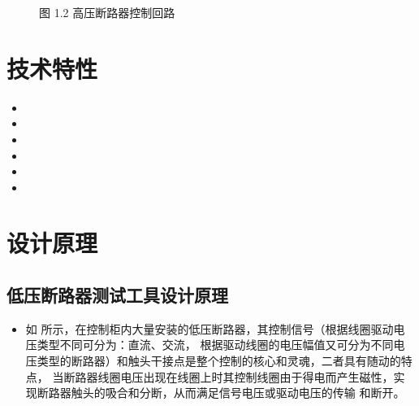 \documentclass[a4paper,10pt,english]{sphinxmanual}
\begin{document}
\begin{figure}[htbp]
\centering
\capstart

\noindent{}
\caption{图 1.2 高压断路器控制回路}\label{\detokenize{summary:id3}}\end{figure}


\section{技术特性}
\label{\detokenize{te_characteristics:id1}}\label{\detokenize{te_characteristics::doc}}\begin{itemize}
\item {} 
\sphinxAtStartPar
{}

\item {} 
\sphinxAtStartPar
{}

\item {} 
\sphinxAtStartPar
{}

\item {} 
\sphinxAtStartPar
{}

\item {} 
\sphinxAtStartPar
{}

\item {} 
\sphinxAtStartPar
{}

\end{itemize}


\section{设计原理}
\label{\detokenize{work_principle:id1}}\label{\detokenize{work_principle::doc}}

\subsection{低压断路器测试工具设计原理}
\label{\detokenize{work_principle:id2}}\begin{itemize}
\item {} 
\sphinxAtStartPar
如  所示，在控制柜内大量安装的低压断路器，其控制信号（根据线圈驱动电压类型不同可分为：直流、交流，
根据驱动线圈的电压幅值又可分为不同电压类型的断路器）和触头干接点是整个控制的核心和灵魂，二者具有随动的特点，
当断路器线圈电压出现在线圈上时其控制线圈由于得电而产生磁性，实现断路器触头的吸合和分断，从而满足信号电压或驱动电压的传输
和断开。

\end{itemize}
\end{document}
